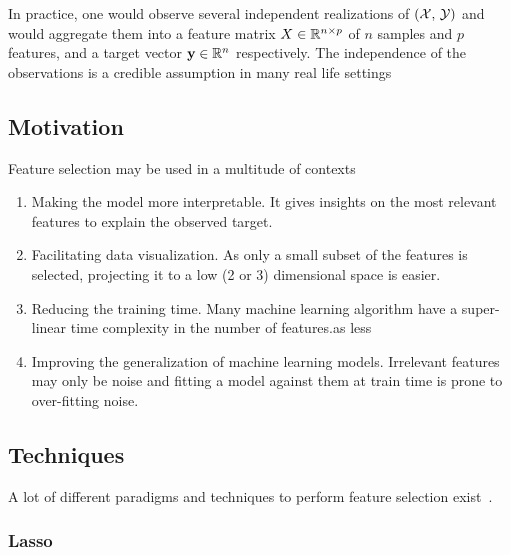 In practice, one would observe several independent realizations of
$\left( \mathcal{X},\, \mathcal{Y} \right)$ and would aggregate them into a feature matrix
$X \in \mathbb{R}^{n \times p}$ of $n$ samples and $p$ features, and a target vector $\mathbf{y} \in \mathbb{R}^n$ respectively.
The independence of the observations is a credible assumption in many real life settings

\subsection{Motivation}\label{subsec:fs_motivation}

Feature selection may be used in a multitude of contexts
\begin{enumerate}
        \item Making the model more interpretable.
                It gives insights on the most relevant features to explain the observed target.
        \item Facilitating data visualization.
                As only a small subset of the features is selected,
                projecting it to a low (2 or 3) dimensional space is easier.
        \item Reducing the training time.
                Many machine learning algorithm have a super-linear time complexity in the number of features.as less
        \item Improving the generalization of machine learning models.
                Irrelevant features may only be noise and fitting a model against them at train time
                is prone to over-fitting noise.
\end{enumerate}


\subsection{Techniques}\label{subsec:fst}

A lot of different paradigms and techniques to perform feature selection exist~\cite{intro_fs}.

\subsubsection{Lasso}

